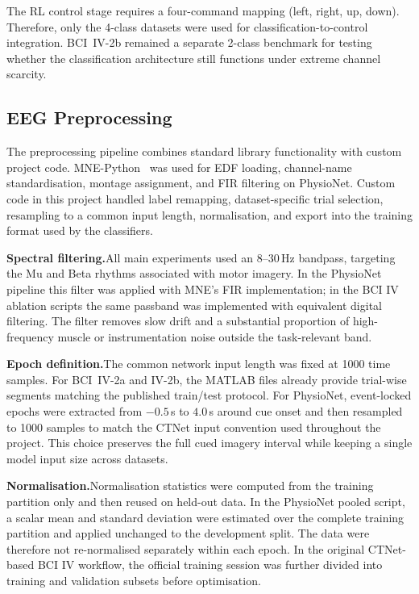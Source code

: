\documentclass[12pt, a4paper]{article}
\begin{document}
The RL control stage requires a four-command mapping (left, right, up, down). Therefore, only the 4-class datasets were used for classification-to-control integration. BCI~IV-2b remained a separate 2-class benchmark for testing whether the classification architecture still functions under extreme channel scarcity.

\subsection{EEG Preprocessing}

The preprocessing pipeline combines standard library functionality with custom project code. MNE-Python~\cite{gramfort2013mne} was used for EDF loading, channel-name standardisation, montage assignment, and FIR filtering on PhysioNet. Custom code in this project handled label remapping, dataset-specific trial selection, resampling to a common input length, normalisation, and export into the training format used by the classifiers.

\textbf{Spectral filtering.}\quad All main experiments used an 8--30\,Hz bandpass, targeting the Mu and Beta rhythms associated with motor imagery. In the PhysioNet pipeline this filter was applied with MNE's FIR implementation; in the BCI IV ablation scripts the same passband was implemented with equivalent digital filtering. The filter removes slow drift and a substantial proportion of high-frequency muscle or instrumentation noise outside the task-relevant band.

\textbf{Epoch definition.}\quad The common network input length was fixed at 1000 time samples. For BCI~IV-2a and IV-2b, the MATLAB files already provide trial-wise segments matching the published train/test protocol. For PhysioNet, event-locked epochs were extracted from $-0.5$\,s to $4.0$\,s around cue onset and then resampled to 1000 samples to match the CTNet input convention used throughout the project. This choice preserves the full cued imagery interval while keeping a single model input size across datasets.

\textbf{Normalisation.}\quad Normalisation statistics were computed from the training partition only and then reused on held-out data. In the PhysioNet pooled script, a scalar mean and standard deviation were estimated over the complete training partition and applied unchanged to the development split. The data were therefore not re-normalised separately within each epoch. In the original CTNet-based BCI IV workflow, the official training session was further divided into training and validation subsets before optimisation.
\end{document}
